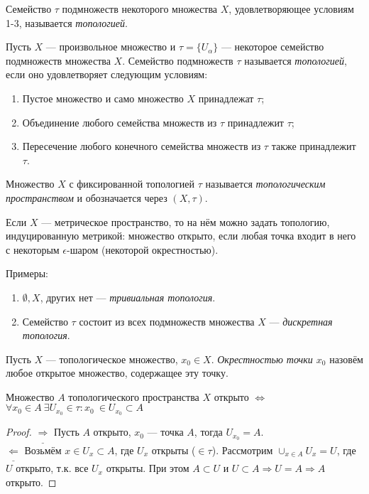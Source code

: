 \begin{definition}
    Семейство $\tau$ подмножеств некоторого множества $X$, удовлетворяющее условиям 1-3, называется \textit{топологией}.
\end{definition}

\begin{definition}
    Пусть $X$ — произвольное множество и $\tau = \{U_{\alpha}\}$ — некоторое семейство подмножеств множества $X$. Семейство подмножеств $\tau$ называется \textit{топологией}, если оно удовлетворяет следующим условиям:
    \begin{enumerate}
        \item Пустое множество и само множество $X$ принадлежат $\tau$;
        \item Объединение любого семейства множеств из $\tau$ принадлежит $\tau$;
        \item Пересечение любого конечного семейства множеств из $\tau$ также принадлежит $\tau$.
    \end{enumerate}
\end{definition}

\begin{definition}
    Множество $X$ с фиксированной топологией $\tau$ называется \textit{топологическим пространством} и обозначается через $(X, \tau)$.
\end{definition}

Если $X$ — метрическое пространство, то на нём можно задать топологию, индуцированную метрикой: множество открыто, если любая точка входит в него с некоторым $\epsilon$-шаром (некоторой окрестностью).

Примеры:
\begin{enumerate}
    \item $\emptyset, X$, других нет — \textit{тривиальная топология}.
    \item Семейство $\tau$ состоит из всех подмножеств множества $X$ — \textit{дискретная топология}.
\end{enumerate}

\begin{definition}
    Пусть $X$ — топологическое множество, $x_0 \in X$. \textit{Окрестностью точки $x_0$} назовём любое открытое множество, содержащее эту точку.
\end{definition}

\begin{statement}
    Множество $A$ топологического пространства $X$ открыто $\Leftrightarrow$ $\forall x_0 \in A \ \exists U_{x_0} \in \tau: x_0 \ \in U_{x_0} \subset A$
\end{statement}
\begin{proof}
    $\underline{\Longrightarrow}$ Пусть $A$ открыто, $x_0$ — точка $A$, тогда $U_{x_0} = A$. \\
    $\underline{\Longleftarrow}$ Возьмём $x \in U_x \subset A$, где $U_x$ открыты ($\in \tau$).
    Рассмотрим $\cup_{x \in A} U_x = U$, где $U$ открыто, т.к. все $U_x$ открыты.
    При этом $A \subset U$ и $U \subset A \Rightarrow U = A \Rightarrow A$ открыто.
\end{proof}

